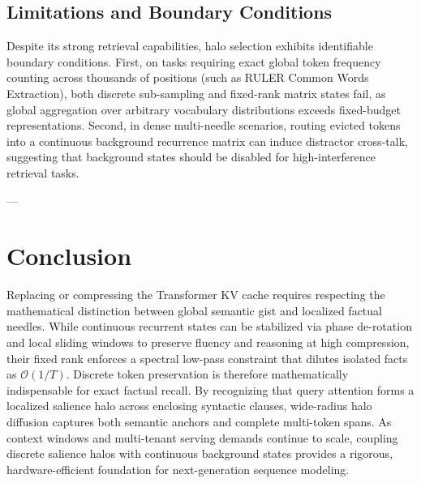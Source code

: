 \documentclass[11pt,a4paper]{article}
\begin{document}
\subsection{Limitations and Boundary Conditions}
Despite its strong retrieval capabilities, halo selection exhibits identifiable boundary conditions. First, on tasks requiring exact global token frequency counting across thousands of positions (such as RULER Common Words Extraction), both discrete sub-sampling and fixed-rank matrix states fail, as global aggregation over arbitrary vocabulary distributions exceeds fixed-budget representations. Second, in dense multi-needle scenarios, routing evicted tokens into a continuous background recurrence matrix can induce distractor cross-talk, suggesting that background states should be disabled for high-interference retrieval tasks.

---

\section{Conclusion}
\label{sec:conclusion}

Replacing or compressing the Transformer KV cache requires respecting the mathematical distinction between global semantic gist and localized factual needles. While continuous recurrent states can be stabilized via phase de-rotation and local sliding windows to preserve fluency and reasoning at high compression, their fixed rank enforces a spectral low-pass constraint that dilutes isolated facts as $\mathcal{O}(1/T)$. Discrete token preservation is therefore mathematically indispensable for exact factual recall. By recognizing that query attention forms a localized salience halo across enclosing syntactic clauses, wide-radius halo diffusion captures both semantic anchors and complete multi-token spans. As context windows and multi-tenant serving demands continue to scale, coupling discrete salience halos with continuous background states provides a rigorous, hardware-efficient foundation for next-generation sequence modeling.
\end{document}

